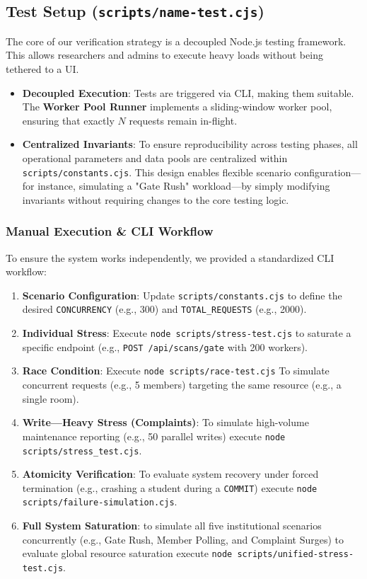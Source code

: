 \documentclass[sigconf]{acmart}
\begin{document}
\subsection{Test Setup (\texttt{scripts/name-test.cjs})}
The core of our verification strategy is a decoupled Node.js testing framework. This allows researchers and admins to execute heavy loads without being tethered to a UI.
\begin{itemize}[leftmargin=*]
    \item \textbf{Decoupled Execution}: Tests are triggered via CLI, making them suitable. The \textbf{Worker Pool Runner} implements a sliding-window worker pool, ensuring that exactly $N$ requests remain in-flight.
    \item \textbf{Centralized Invariants}: To ensure reproducibility across testing phases, all operational parameters and data pools are centralized within \texttt{scripts/constants.cjs}. This design enables flexible scenario configuration—for instance, simulating a "Gate Rush" workload—by simply modifying invariants without requiring changes to the core testing logic.
\end{itemize}


\subsubsection{Manual Execution \& CLI Workflow}
To ensure the system works independently, we provided a standardized CLI workflow:
\begin{enumerate}[leftmargin=*]
    \item \textbf{Scenario Configuration}: Update \texttt{scripts/constants.cjs} to define the desired \texttt{CONCURRENCY} (e.g., 300) and \texttt{TOTAL\_REQUESTS} (e.g., 2000).
    \item \textbf{Individual Stress}: Execute \texttt{node scripts/stress-test.cjs} to saturate a specific endpoint (e.g., \texttt{POST /api/scans/gate} with 200 workers).
    \item \textbf{Race Condition}: Execute \texttt{node scripts/race-test.cjs} To simulate concurrent requests (e.g., 5 members) targeting the same resource (e.g., a single room).
    \item \textbf{Write—Heavy Stress (Complaints)}: To simulate high-volume maintenance reporting (e.g., 50 parallel writes) execute \texttt{node scripts/stress\_test.cjs}.
    \item \textbf{Atomicity Verification}: To evaluate system recovery under forced termination (e.g., crashing a student during a \texttt{COMMIT}) execute \texttt{node scripts/failure-simulation.cjs}.
    \item \textbf{Full System Saturation}: to simulate all five institutional scenarios concurrently (e.g., Gate Rush, Member Polling, and Complaint Surges) to evaluate global resource saturation execute \texttt{node scripts/unified-stress-test.cjs}.
\end{enumerate}
\end{document}
